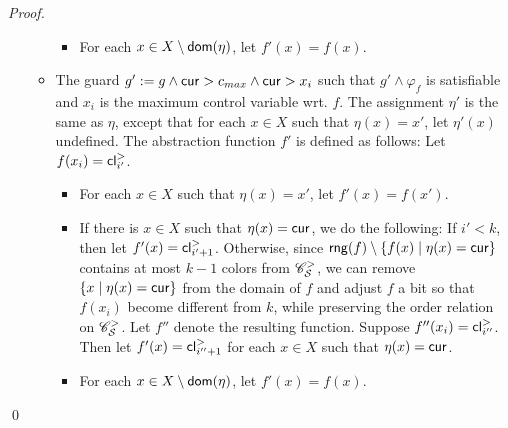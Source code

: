 \begin{appendix}
\begin{proof}
\begin{itemize}
\begin{itemize}
\begin{itemize}
\item For each $x \in X \setminus \mathsf{dom}(\eta)$, let $f'(x)=f(x)$.  
\end{itemize}
%
\item The guard $g' := g \wedge \mathsf{cur} > c_{max} \wedge  \mathsf{cur} > x_i$ such that $g' \wedge \varphi_f$ is satisfiable and $x_i$ is the maximum control variable wrt. $f$. The assignment $\eta'$ is the same as $\eta$, except that for each $x \in X$ such that $\eta(x)=x'$, let $\eta'(x)$ undefined.  The abstraction function $f'$ is defined as follows: Let $f(x_i)=\mathsf{cl}^>_{i'}$.
\begin{itemize}
\item For each $x \in X$ such that $\eta(x)=x'$, let $f'(x)=f(x')$.
%
\item If there is $x \in X$ such that $\eta(x)=\mathsf{cur}$, we do the following: If $i' < k$, then let $f'(x)= \mathsf{cl}^{>}_{i'+1}$. Otherwise, since $\mathsf{rng}(f) \setminus \{f(x) \mid \eta(x)=\mathsf{cur}\}$ contains at most $k-1$ colors from $\mathscr{C}^>_{\mathcal{S} }$,  we can remove $\{x \mid \eta(x)=\mathsf{cur}\}$ from the domain of $f$ and adjust $f$ a bit so that $f(x_i)$ become different from $k$, while preserving the order relation on $\mathscr{C}^>_{\mathcal{S} }$. Let $f''$ denote the resulting function. Suppose $f''(x_i)=\mathsf{cl}^>_{i''}$. Then let $f'(x)=\mathsf{cl}^>_{i''+1}$ for each $x \in X$ such that $\eta(x)=\mathsf{cur}$. 

\item For each $x \in X \setminus \mathsf{dom}(\eta)$, let $f'(x)=f(x)$. 
\end{itemize}
\end{itemize}
\end{itemize}
\qed


\end{proof}
\end{appendix}
